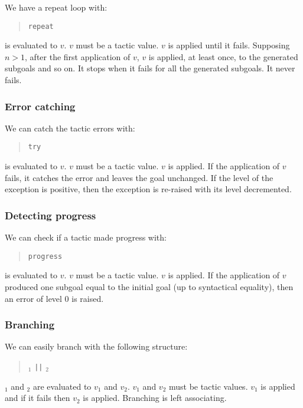 We have a repeat loop with:
\begin{quote}
{\tt repeat} {\tacexpr}
\end{quote}
{\tacexpr} is evaluated to $v$. $v$ must be a tactic value. $v$ is
applied until it fails. Supposing $n>1$, after the first application
of $v$, $v$ is applied, at least once, to the generated subgoals and
so on. It stops when it fails for all the generated subgoals. It never
fails.

\subsubsection{Error catching}

We can catch the tactic errors with:
\begin{quote}
{\tt try} {\tacexpr}
\end{quote}
{\tacexpr} is evaluated to $v$. $v$ must be a tactic value. $v$ is
applied. If the application of $v$ fails, it catches the error and
leaves the goal unchanged. If the level of the exception is positive,
then the exception is re-raised with its level decremented.

\subsubsection{Detecting progress}

We can check if a tactic made progress with:
\begin{quote}
{\tt progress} {\tacexpr}
\end{quote}
{\tacexpr} is evaluated to $v$. $v$ must be a tactic value. $v$ is
applied. If the application of $v$ produced one subgoal equal to the
initial goal (up to syntactical equality), then an error of level 0 is
raised. 

\ErrMsg {}

\subsubsection{Branching}
\tacindex{$\mid\mid$}

We can easily branch with the following structure:
\begin{quote}
{\tacexpr}$_1$ {\tt ||} {\tacexpr}$_2$
\end{quote}
{\tacexpr}$_1$ and {\tacexpr}$_2$ are evaluated to $v_1$ and
$v_2$. $v_1$ and $v_2$ must be tactic values. $v_1$ is applied and if
it fails then $v_2$ is applied. Branching is left associating.

